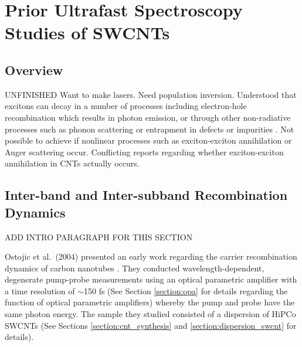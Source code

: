 \chapter{Prior Ultrafast Spectroscopy Studies of SWCNTs}

\section{Overview}

{\color{red} UNFINISHED} Want to make lasers. Need population inversion. Understood that excitons can decay in a number of processes including electron-hole recombination which results in photon emission, or through other non-radiative processes such as phonon scattering or entrapment in defects or impurities \cite{simpson1957electronic}. Not possible to achieve if nonlinear processes such as exciton-exciton annihilation or Auger scattering occur. Conflicting reports regarding whether exciton-exciton annihilation in CNTs actually occurs.


\section{Inter-band and Inter-subband Recombination Dynamics}

{\color{red} ADD INTRO PARAGRAPH FOR THIS SECTION}

Ostojic et al.\ (2004) presented an early work regarding the carrier recombination dynamics of carbon nanotubes \cite{ostojic2004interband}. They conducted wavelength-dependent, degenerate pump-probe measurements using an optical parametric amplifier with a time resolution of $\sim$150 fs (See Section \ref{section:opa} for details regarding the function of optical parametric amplifiers) whereby the pump and probe have the same photon energy. The sample they studied consisted of a dispersion of HiPCo SWCNTs (See Sections \ref{section:cnt_synthesis} and \ref{section:dispersion_swcnt} for details).

